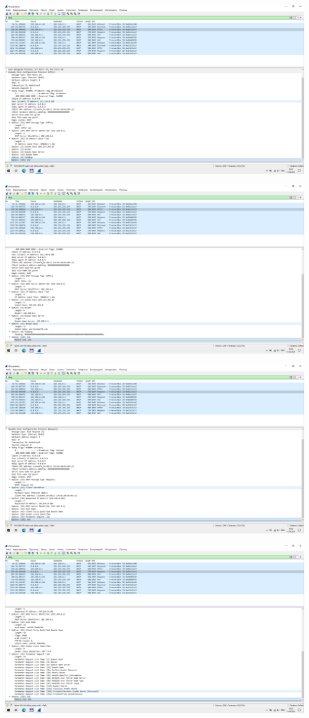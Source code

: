 \begin{center}
    \includegraphics[width=\textwidth]{screenshots/dhcp_offer_1}

    \includegraphics[width=\textwidth]{screenshots/dhcp_offer_2}

    \includegraphics[width=\textwidth]{screenshots/dhcp_request1_1}

    \includegraphics[width=\textwidth]{screenshots/dhcp_request1_2}


\end{center}
